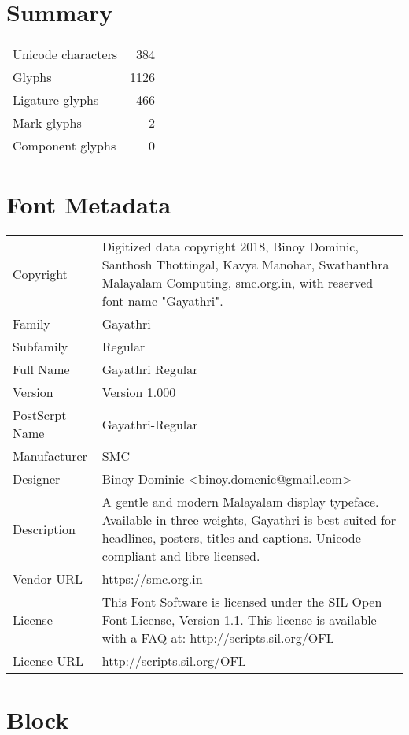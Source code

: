 \section{Summary}

\begin{tabular}[l]{|l|r|}
\hline
Unicode characters & 384 \\
Glyphs & 1126 \\
Ligature glyphs & 466 \\
Mark glyphs & 2 \\
Component glyphs & 0 \\\hline\end{tabular}
\section{Font Metadata}
\begin{longtable}{lp{10cm}}  
    \hline
    \endhead
    \hline
    \endfoot
  Copyright & Digitized data copyright 2018, Binoy Dominic, Santhosh Thottingal, Kavya Manohar, Swathanthra Malayalam Computing, smc.org.in, with reserved font name "Gayathri". \\
Family & Gayathri \\
Subfamily & Regular \\
Full Name & Gayathri Regular \\
Version & Version 1.000 \\
PostScrpt Name & Gayathri-Regular \\
Manufacturer & SMC \\
Designer & Binoy Dominic <binoy.domenic@gmail.com> \\
Description & A gentle and modern Malayalam display typeface. Available in three weights, Gayathri is best suited for headlines, posters, titles and captions. Unicode compliant and libre licensed. \\
Vendor URL & https://smc.org.in \\
License & This Font Software is licensed under the SIL Open Font License, Version 1.1. This license is available with a FAQ at: http://scripts.sil.org/OFL \\
License URL & http://scripts.sil.org/OFL \\
\end{longtable}
\section{Block}

    \newcommand\cell[2]{\begin{tabular}[c]{@{}c@{}}
      \customfont{\symbol{#1}}\\ \tiny{#2}\end{tabular}}
  

